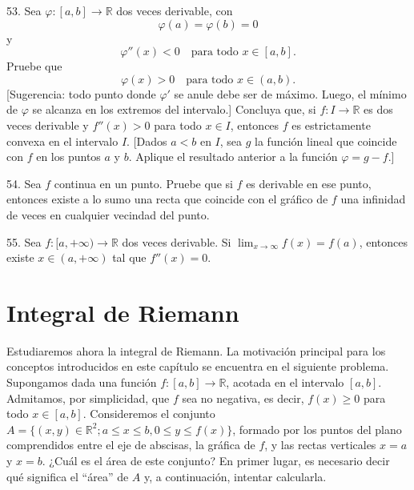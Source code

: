 \documentclass[12pt,oneside]{book}
\begin{document}
53. Sea \( \varphi: [a, b] \to \mathbb{R} \) dos veces derivable, con
\[
\varphi(a) = \varphi(b) = 0
\]
y
\[
\varphi''(x) < 0 \quad \text{para todo } x \in [a, b].
\]
Pruebe que
\[
\varphi(x) > 0 \quad \text{para todo } x \in (a, b).
\]
[Sugerencia: todo punto donde \( \varphi' \) se anule debe ser de máximo. Luego, el mínimo de \(\varphi\) se alcanza en los extremos del intervalo.] Concluya que, si \( f: I \to \mathbb{R} \) es dos veces derivable y \( f''(x) > 0 \) para todo \( x \in I \), entonces \( f \) es estrictamente convexa en el intervalo \( I \). [Dados \( a < b \) en \( I \), sea \( g \) la función lineal que coincide con \( f \) en los puntos \( a \) y \( b \). Aplique el resultado anterior a la función \( \varphi = g - f \).]

54. Sea \( f \) continua en un punto. Pruebe que si \( f \) es derivable en ese punto, entonces existe a lo sumo una recta que coincide con el gráfico de \( f \) una infinidad de veces en cualquier vecindad del punto.

55. Sea \( f: [a, +\infty) \to \mathbb{R} \) dos veces derivable. Si \( \lim_{x \to \infty} f(x) = f(a) \), entonces existe \( x \in (a, +\infty) \) tal que \( f''(x) = 0 \).

\newpage

\chapter{Integral de Riemann}

Estudiaremos ahora la integral de Riemann. La motivación principal para los conceptos introducidos en este capítulo se encuentra en el siguiente problema. Supongamos dada una función \(f: [a, b] \to \mathbb{R}\), acotada en el intervalo \([a, b]\). Admitamos, por simplicidad, que \(f\) sea no negativa, es decir, \(f(x) \ge 0\) para todo \(x \in [a, b]\). Consideremos el conjunto \(A = \{(x, y) \in \mathbb{R}^2; a \le x \le b, 0 \le y \le f(x)\}\), formado por los puntos del plano comprendidos entre el eje de abscisas, la gráfica de \(f\), y las rectas verticales \(x = a\) y \(x = b\). ¿Cuál es el área de este conjunto? En primer lugar, es necesario decir qué significa el “área” de \(A\) y, a continuación, intentar calcularla.
\end{document}
